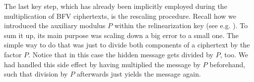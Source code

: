 \documentclass[letterpaper,10pt,english]{jupyterBook}
\begin{document}
\label{\detokenize{Thesis:rescaling}}
\begin{DUlineblock}{0em}
\item[] 
\end{DUlineblock}

\sphinxAtStartPar
The last key step, which has already been implicitly employed during the multiplication of BFV ciphertexts, is the rescaling procedure.
Recall how we introduced the auxiliary modulus \(P\) within the relinearization key (see e.g. {\hyperref[\detokenize{Thesis:relinearization-error}]{}}).
To sum it up, its main purpose was scaling down a big error to a small one.
The simple way to do that was just to divide both components of a ciphertext by the factor \(P\).
Notice that in this case the hidden message gets divided by \(P\), too.
We had handled this side effect by having multiplied the message by \(P\) beforehand, such that division by \(P\) afterwards just yields the message again.
\end{document}
